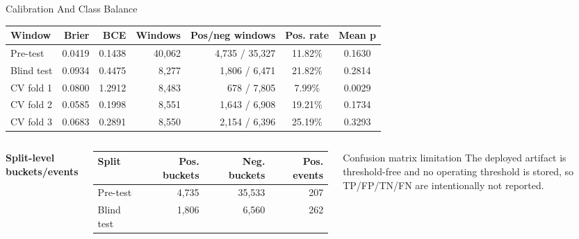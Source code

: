 \documentclass[aspectratio=169]{beamer}
\begin{document}
\begin{frame}[shrink=6]{Calibration And Class Balance}
\tiny
\renewcommand{\arraystretch}{1.08}
\begin{tabular}{@{}lrrrrcc@{}}
\toprule
\textbf{Window} & \textbf{Brier} & \textbf{BCE} & \textbf{Windows} & \textbf{Pos/neg windows} & \textbf{Pos. rate} & \textbf{Mean p} \\
\midrule
Pre-test & 0.0419 & 0.1438 & 40,062 & 4,735 / 35,327 & 11.82\% & 0.1630 \\
Blind test & 0.0934 & 0.4475 & 8,277 & 1,806 / 6,471 & 21.82\% & 0.2814 \\
CV fold 1 & 0.0800 & 1.2912 & 8,483 & 678 / 7,805 & 7.99\% & 0.0029 \\
CV fold 2 & 0.0585 & 0.1998 & 8,551 & 1,643 / 6,908 & 19.21\% & 0.1734 \\
CV fold 3 & 0.0683 & 0.2891 & 8,550 & 2,154 / 6,396 & 25.19\% & 0.3293 \\
\bottomrule
\end{tabular}
\tightsep
\begin{columns}[T,onlytextwidth]
\textbf{Split-level buckets/events}
\begin{tabular}{@{}lrrr@{}}
\toprule
\textbf{Split} & \textbf{Pos. buckets} & \textbf{Neg. buckets} & \textbf{Pos. events} \\
\midrule
Pre-test & 4,735 & 35,533 & 207 \\
Blind test & 1,806 & 6,560 & 262 \\
\bottomrule
\end{tabular}

\begin{block}{Confusion matrix limitation}
\scriptsize The deployed artifact is threshold-free and no operating threshold is stored, so TP/FP/TN/FN are intentionally not reported.
\end{block}
\end{columns}
\renewcommand{\arraystretch}{1.0}
\end{frame}
\end{document}
